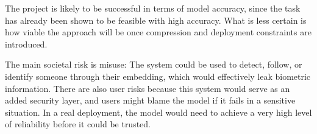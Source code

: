 The project is likely to be successful in terms of model accuracy, since the task has already been shown to be feasible with high accuracy. What is less certain is how viable the approach will be once compression and deployment constraints are introduced.

The main societal risk is misuse: The system could be used to detect, follow, or identify someone through their embedding, which would effectively leak biometric information. There are also user risks because this system would serve as an added security layer, and users might blame the model if it fails in a sensitive situation. In a real deployment, the model would need to achieve a very high level of reliability before it could be trusted.

\newpage
